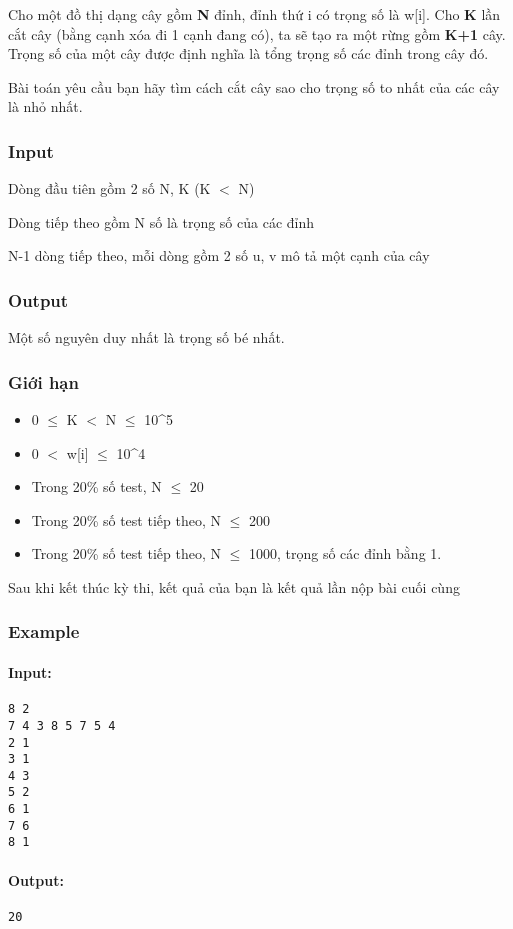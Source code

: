 



   Cho một đồ thị dạng cây gồm   \textbf{    N   }   đỉnh, đỉnh thứ i có trọng số là w[i]. Cho   \textbf{    K   }   lần cắt cây (bằng cạnh xóa đi 1 cạnh đang có), ta sẽ tạo ra một rừng gồm   \textbf{    K+1   }   cây. Trọng số của một cây được định nghĩa là tổng trọng số các đỉnh trong cây đó.  

   Bài toán yêu cầu bạn hãy tìm cách cắt cây sao cho trọng số to nhất của các cây là nhỏ nhất.  

\subsubsection{   Input  }

   Dòng đầu tiên gồm 2 số N, K (K $<$ N)  

   Dòng tiếp theo gồm N số là trọng số của các đỉnh  

   N-1 dòng tiếp theo, mỗi dòng gồm 2 số u, v mô tả một cạnh của cây  

\subsubsection{   Output  }

   Một số nguyên duy nhất là trọng số bé nhất.  

\subsubsection{   Giới hạn  }
\begin{itemize}
	\item     0  $\le$  K $<$ N  $\le$  10^5   
	\item     0 $<$ w[i]  $\le$  10^4   
	\item     Trong 20\% số test, N  $\le$  20   
	\item     Trong 20\% số test tiếp theo, N  $\le$  200   
	\item     Trong 20\% số test tiếp theo, N  $\le$  1000, trọng số các đỉnh bằng 1.   
\end{itemize}

    Sau khi kết thúc kỳ thi, kết quả của bạn là kết quả lần nộp bài cuối cùng   

\textbf{}

\subsubsection{\textbf{    Example   }}

\paragraph{   Input:  }
\begin{verbatim}
8 2
7 4 3 8 5 7 5 4
2 1
3 1
4 3
5 2
6 1
7 6
8 1\end{verbatim}

\paragraph{   Output:  }
\begin{verbatim}
20\end{verbatim}
